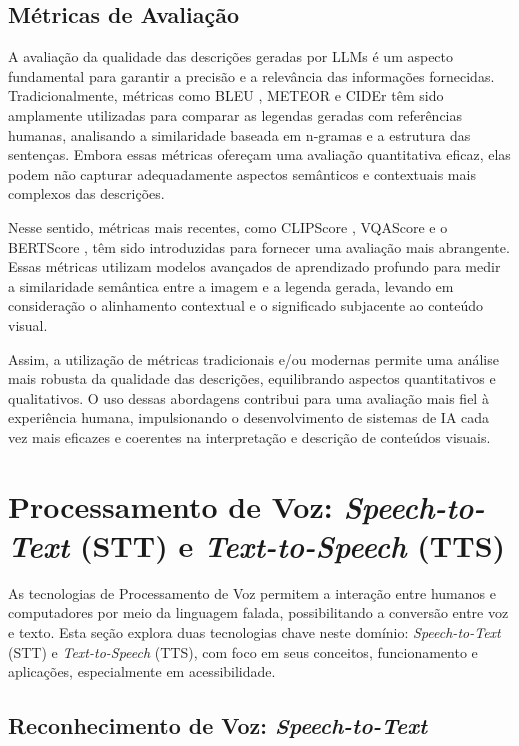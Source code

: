 \subsection{Métricas de Avaliação}

A avaliação da qualidade das descrições geradas por LLMs é um aspecto fundamental para garantir a precisão e a relevância das informações fornecidas. Tradicionalmente, métricas como BLEU \cite{Papineni2001}, METEOR \cite{banerjee2005} e CIDEr \cite{Vedantam2015} têm sido amplamente utilizadas para comparar as legendas geradas com referências humanas, analisando a similaridade baseada em n-gramas e a estrutura das sentenças. Embora essas métricas ofereçam uma avaliação quantitativa eficaz, elas podem não capturar adequadamente aspectos semânticos e contextuais mais complexos das descrições.

Nesse sentido, métricas mais recentes, como CLIPScore \cite{hessel-etal-2021-clipscore}, VQAScore \cite{lin2024} e o BERTScore \cite{Zhang2020:}, têm sido introduzidas para fornecer uma avaliação mais abrangente. Essas métricas utilizam modelos avançados de aprendizado profundo para medir a similaridade semântica entre a imagem e a legenda gerada, levando em consideração o alinhamento contextual e o significado subjacente ao conteúdo visual.

Assim, a utilização de métricas tradicionais e/ou modernas permite uma análise mais robusta da qualidade das descrições, equilibrando aspectos quantitativos e qualitativos. O uso dessas abordagens contribui para uma avaliação mais fiel à experiência humana, impulsionando o desenvolvimento de sistemas de IA cada vez mais eficazes e coerentes na interpretação e descrição de conteúdos visuais.

\section{Processamento de Voz: \textit{Speech-to-Text} (STT) e \textit{Text-to-Speech} (TTS)}

As tecnologias de Processamento de Voz permitem a interação entre humanos e computadores por meio da linguagem falada, possibilitando a conversão entre voz e texto. Esta seção explora duas tecnologias chave neste domínio: \textit{Speech-to-Text} (STT) e \textit{Text-to-Speech} (TTS), com foco em seus conceitos,  funcionamento e aplicações, especialmente em acessibilidade.

\subsection{Reconhecimento de Voz: \textit{Speech-to-Text}}

